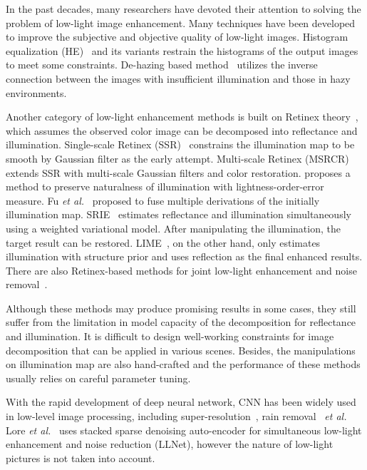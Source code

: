 \documentclass{bmvc2k}
\begin{document}
In the past decades, many researchers have devoted their attention to solving the problem of low-light image enhancement. Many techniques have been developed to improve the subjective and objective quality of low-light images. Histogram equalization (HE)~\cite{Pizer1987Adaptive} and its variants restrain the histograms of the output images to meet some constraints. De-hazing based method~\cite{Dong2011Fast} utilizes the inverse connection between the images with insufficient illumination and those in hazy environments.

Another category of low-light enhancement methods is built on Retinex theory~\cite{Land1977The}, which assumes the observed color image can be decomposed into reflectance and illumination.  Single-scale Retinex (SSR)~\cite{Jobson1997Properties} constrains the illumination map to be smooth by Gaussian filter as the early attempt. Multi-scale Retinex (MSRCR)~\cite{Jobson1997A} extends SSR with multi-scale Gaussian filters and color restoration. \cite{Wang2013Naturalness} proposes a method to preserve naturalness of illumination with lightness-order-error measure. Fu \emph{et al.}~\cite{Fu2016B} proposed to fuse multiple derivations of the initially illumination map.  SRIE~\cite{Fu2016B} estimates reflectance and illumination simultaneously using a weighted variational model. After manipulating the illumination, the target result can be restored. LIME~\cite{Guo2017LIME}, on the other hand, only estimates illumination with structure prior and uses reflection as the final enhanced results. There are also Retinex-based methods for joint low-light enhancement and noise removal~\cite{Li2017Joint,Li2018Structure}.

Although these methods may produce promising results in some cases, they still suffer from the limitation in model capacity of the decomposition for reflectance and illumination. It is difficult to design well-working constraints for image decomposition that can be applied
in various scenes. Besides, the manipulations on illumination map are also hand-crafted and the performance of these methods usually relies on careful parameter tuning.

With the rapid development of deep neural network, CNN has been widely used in low-level image processing, including super-resolution~\cite{yang2018video,fang2018blind,yang2018reference,Yang2017Deep2}, rain removal~\cite{yang2017deep, Liu_2018_CVPR, Qian_2018_CVPR} \emph{et al.} Lore \emph{et al.}~\cite{lore2017llnet} uses stacked sparse denoising auto-encoder for simultaneous low-light enhancement and noise reduction (LLNet), however the nature of low-light pictures is not taken into account.
\end{document}
